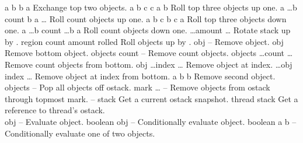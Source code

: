 \begin{longtable}{}
\hline
\optableent
	{a b}
	{{\bf {}}}
	{b a}
	{Exchange top two objects.}
\hline
\optableent
	{a b c}
	{{\bf {}}}
	{c a b}
	{Roll top three objects up one.}
\hline
\optableent
	{a \dots b count}
	{{\bf {}}}
	{b a \dots}
	{Roll count objects up one.}
\hline
\optableent
	{a b c}
	{{\bf {}}}
	{b c a}
	{Roll top three objects down one.}
\hline
\optableent
	{a \dots b count}
	{{\bf {}}}
	{\dots b a}
	{Roll count objects down one.}
\hline
\optableent
	{\dots amount}
	{{\bf {}}}
	{\dots}
	{Rotate stack up by .}
\hline
\optableent
	{region count amount}
	{{\bf {}}}
	{rolled}
	{Roll  objects up by .}
\hline
\optableent
	{obj}
	{{\bf {}}}
	{--}
	{Remove object.}
\hline
\optableent
	{obj \commas}
	{{\bf {}}}
	{\commas}
	{Remove bottom object.}
\hline
\optableent
	{objects count}
	{{\bf {}}}
	{--}
	{Remove count objects.}
\hline
\optableent
	{objects \dots count}
	{{\bf {}}}
	{\dots}
	{Remove count objects from bottom.}
\hline
\optableent
	{obj \dots index}
	{{\bf {}}}
	{\dots}
	{Remove object at index.}
\hline
\optableent
	{\dots obj \commas index}
	{{\bf {}}}
	{\dots \commas}
	{Remove object at index from bottom.}
\hline
\optableent
	{a b}
	{{\bf {}}}
	{b}
	{Remove second object.}
\hline
\optableent
	{objects}
	{{\bf {}}}
	{--}
	{Pop all objects off ostack.}
\hline
\optableent
	{mark \dots}
	{{\bf {}}}
	{--}
	{Remove objects from ostack through topmost mark.}
\hline
\optableent
	{--}
	{{\bf {}}}
	{stack}
	{Get a current ostack snapshot.}
\hline
\optableent
	{thread}
	{{\bf {}}}
	{stack}
	{Get a reference to thread's ostack.}
\hline \hline
{} \\
\hline \hline
\optableent
	{obj}
	{{\bf {}}}
	{--}
	{Evaluate object.}
\hline
\optableent
	{boolean obj}
	{{\bf {}}}
	{--}
	{Conditionally evaluate object.}
\hline
\optableent
	{boolean a b}
	{{\bf {}}}
	{--}
	{Conditionally evaluate one of two objects.}
\hline

\end{longtable}
